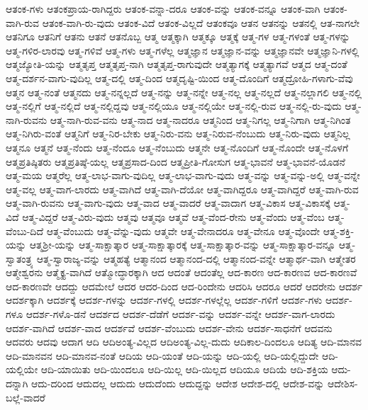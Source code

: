 {ಆತಂಕ-ಗಳು
ಆತಂಕಪ್ರಾಯ-ರಾಗಿದ್ದರು
ಆತಂಕ-ವನ್ನಾ-ದರೂ
ಆತಂಕ-ವನ್ನು
ಆತಂಕ-ವನ್ನೂ
ಆತಂಕ-ವಾಗಿ
ಆತಂಕ-ವಾಗಿ-ರುವ
ಆತಂಕ-ವಾಗಿ-ರು-ವುದು
ಆತಂಕ-ವಿದೆ
ಆತಂಕ-ವಿಲ್ಲದೆ
ಆತಂಕವೂ
ಆತನ
ಆತನನ್ನು
ಆತನಲ್ಲಿ
ಆತ-ನಾಗಲೇ
ಆತನಿಗೂ
ಆತನಿಗೆ
ಆತನು
ಆತನೆ
ಆತನೊಬ್ಬ
ಆತ್ಮ
ಆತ್ಮಕ್ಕಾಗಿ
ಆತ್ಮಕ್ಕೂ
ಆತ್ಮಕ್ಕೆ
ಆತ್ಮ-ಗಳ
ಆತ್ಮ-ಗಳಂತೆ
ಆತ್ಮ-ಗಳನ್ನು
ಆತ್ಮ-ಗಳಿರ-ಲಾರವು
ಆತ್ಮ-ಗಳಿವೆ
ಆತ್ಮ-ಗಳು
ಆತ್ಮ-ಗಳೆಲ್ಲ
ಆತ್ಮಜ್ಞಾನ
ಆತ್ಮಜ್ಞಾನ-ವನ್ನು
ಆತ್ಮಜ್ಞಾನವೇ
ಆತ್ಮಜ್ಞಾನಿ-ಗಳಲ್ಲಿ
ಆತ್ಮಜ್ಯೋತಿ-ಯನ್ನು
ಆತ್ಮತೃಪ್ತ
ಆತ್ಮತೃಪ್ತ-ನಾಗಿ
ಆತ್ಮತೃಪ್ತ-ರಾಗುವುದೇ
ಆತ್ಮತ್ಯಾಗಕ್ಕೆ
ಆತ್ಮತ್ಯಾಗವೆ
ಆತ್ಮದ
ಆತ್ಮ-ದಂತೆ
ಆತ್ಮ-ದರ್ಶನ-ವಾಗು-ವುದಿಲ್ಲ
ಆತ್ಮ-ದಲ್ಲಿ
ಆತ್ಮ-ದಿಂದ
ಆತ್ಮದೃಷ್ಟಿ-ಯಿಂದ
ಆತ್ಮ-ದೊಂದಿಗೆ
ಆತ್ಮದ್ರೋಹಿ-ಗಳಾಗು-ವೆವು
ಆತ್ಮನ
ಆತ್ಮ-ನಂತೆ
ಆತ್ಮನದು
ಆತ್ಮ-ನನ್ನಲ್ಲದೆ
ಆತ್ಮ-ನನ್ನು
ಆತ್ಮ-ನನ್ನೇ
ಆತ್ಮ-ನಲ್ಲ
ಆತ್ಮ-ನಲ್ಲದೆ
ಆತ್ಮ-ನಲ್ಲಾಗಲಿ
ಆತ್ಮ-ನಲ್ಲಿ
ಆತ್ಮ-ನಲ್ಲಿಗೆ
ಆತ್ಮ-ನಲ್ಲಿದೆ
ಆತ್ಮ-ನಲ್ಲಿದ್ದವು
ಆತ್ಮ-ನಲ್ಲಿಯೂ
ಆತ್ಮ-ನಲ್ಲಿಯೇ
ಆತ್ಮ-ನಲ್ಲಿ-ರುವ
ಆತ್ಮ-ನಲ್ಲಿ-ರು-ವುದು
ಆತ್ಮ-ನಾಗಿ-ರುವನು
ಆತ್ಮ-ನಾಗಿ-ರುವ-ವನು
ಆತ್ಮ-ನಾದ
ಆತ್ಮ-ನಾದರೂ
ಆತ್ಮನಿಂದ
ಆತ್ಮ-ನಿಗಲ್ಲ
ಆತ್ಮ-ನಿಗಾಗಿ
ಆತ್ಮ-ನಿಗಿಂತ
ಆತ್ಮ-ನಿಗಿರು-ವಂತೆ
ಆತ್ಮನಿಗೆ
ಆತ್ಮ-ನಿರ-ಬೇಕು
ಆತ್ಮ-ನಿರು-ವನು
ಆತ್ಮ-ನಿರುವ-ನೆಂಬುದು
ಆತ್ಮ-ನಿರು-ವುದು
ಆತ್ಮನಿಲ್ಲ
ಆತ್ಮನೂ
ಆತ್ಮನೆ
ಆತ್ಮ-ನೆಂದು
ಆತ್ಮ-ನೆಂದೂ
ಆತ್ಮ-ನೆಂಬುದು
ಆತ್ಮನೇ
ಆತ್ಮ-ನೊಂದಿಗೆ
ಆತ್ಮ-ನೊಂದೇ
ಆತ್ಮ-ನೊಳಗೆ
ಆತ್ಮಪ್ರತಿಷ್ಠಿತರು
ಆತ್ಮಪ್ರತಿಷ್ಠೆ-ಯಲ್ಲ
ಆತ್ಮಪ್ರಸಾದ-ದಿಂದ
ಆತ್ಮಪ್ರೀತಿ-ಗೋಸುಗ
ಆತ್ಮ-ಭಾವನೆ
ಆತ್ಮ-ಭಾವನೆ-ಯೊಡನೆ
ಆತ್ಮ-ಮಯ
ಆತ್ಮರೆಲ್ಲ
ಆತ್ಮ-ಲಾಭ-ವಾಗು-ವುದಿಲ್ಲ
ಆತ್ಮ-ಲಾಭ-ವಾಗು-ವುದು
ಆತ್ಮ-ವನ್ನು
ಆತ್ಮ-ವನ್ನು-ಅಲ್ಲಿ
ಆತ್ಮ-ವನ್ನೇ
ಆತ್ಮ-ವಲ್ಲ
ಆತ್ಮ-ವಾಗ-ಲಾರದು
ಆತ್ಮ-ವಾಗಿದೆ
ಆತ್ಮ-ವಾಗಿ-ದೆಯೋ
ಆತ್ಮ-ವಾಗಿದ್ದರೂ
ಆತ್ಮ-ವಾಗಿದ್ದರೆ
ಆತ್ಮ-ವಾಗಿ-ರುವ
ಆತ್ಮ-ವಾಗಿ-ರುವನು
ಆತ್ಮ-ವಾಗು-ವುದು
ಆತ್ಮ-ವಾದ
ಆತ್ಮ-ವಾದರೆ
ಆತ್ಮ-ವಾದಾಗ
ಆತ್ಮ-ವಿಕಾಸ
ಆತ್ಮ-ವಿಕಾಸಕ್ಕೆ
ಆತ್ಮ-ವಿದೆ
ಆತ್ಮ-ವಿದ್ದರೆ
ಆತ್ಮ-ವಿರು-ವುದು
ಆತ್ಮವು
ಆತ್ಮವೂ
ಆತ್ಮವೆ
ಆತ್ಮ-ವೆಂದ-ರೇನು
ಆತ್ಮ-ವೆಂದು
ಆತ್ಮ-ವೆಂಬ
ಆತ್ಮ-ವೆಂಬು-ದಿದೆ
ಆತ್ಮ-ವೆಂಬುದು
ಆತ್ಮ-ವೆನ್ನು-ವುದು
ಆತ್ಮವೇ
ಆತ್ಮ-ವೇನಾದರೂ
ಆತ್ಮ-ವೇನೂ
ಆತ್ಮ-ವೊಂದೇ
ಆತ್ಮ-ಶಕ್ತಿ-ಯನ್ನು
ಆತ್ಮಶ್ರೀ-ಯನ್ನು
ಆತ್ಮ-ಸಾಕ್ಷಾತ್ಕಾರ
ಆತ್ಮ-ಸಾಕ್ಷಾತ್ಕಾರಕ್ಕೆ
ಆತ್ಮ-ಸಾಕ್ಷಾತ್ಕಾರ-ವನ್ನು
ಆತ್ಮ-ಸಾಕ್ಷಾತ್ಕಾರ-ವನ್ನೂ
ಆತ್ಮ-ಸ್ವಾತಂತ್ರ್ಯ
ಆತ್ಮ-ಸ್ವಾರಾಜ್ಯ-ವನ್ನು
ಆತ್ಮಹತ್ಯೆ
ಆತ್ಮಾನಂದ
ಆತ್ಮಾನಂದ-ದಲ್ಲಿ
ಆತ್ಮಾನಂದ-ವನ್ನೇ
ಆತ್ಮಾರ್ಥ-ವಾಗಿ
ಆತ್ಮೇತರ
ಆತ್ಮೇಶ್ವರನು
ಆತ್ಮೈಕ್ಯ-ವಾಗಿದೆ
ಆತ್ಮೋದ್ಧಾರಕ್ಕಾಗಿ
ಆದ
ಆದಂತೆ
ಆದಂತೆಲ್ಲ
ಆದ-ಕಾರಣ
ಆದ-ಕಾರಣವ
ಆದ-ಕಾರಣವೆ
ಆದ-ಕಾರಣವೇ
ಆದದ್ದು
ಆದಮೇಲೆ
ಆದರ
ಆದರ-ದಿಂದ
ಆದ-ರಿಂದೇನು
ಆದರಿಸಿ
ಆದರೂ
ಆದರೆ
ಆದರೇನು
ಆದರ್ಶ
ಆದರ್ಶಕ್ಕಾಗಿ
ಆದರ್ಶಕ್ಕೆ
ಆದರ್ಶ-ಗಳನ್ನು
ಆದರ್ಶ-ಗಳಲ್ಲಿ
ಆದರ್ಶ-ಗಳಲ್ಲೆಲ್ಲ
ಆದರ್ಶ-ಗಳಿಗೆ
ಆದರ್ಶ-ಗಳು
ಆದರ್ಶ-ಗಳೂ
ಆದರ್ಶ-ಗಳೊ-ಡನೆ
ಆದರ್ಶದ
ಆದರ್ಶ-ದೆಡೆಗೆ
ಆದರ್ಶ-ವನ್ನು
ಆದರ್ಶ-ವನ್ನೇ
ಆದರ್ಶ-ವಾಗ-ಲಾರದು
ಆದರ್ಶ-ವಾಗಿದೆ
ಆದರ್ಶ-ವಾದ
ಆದರ್ಶವೆ
ಆದರ್ಶ-ವೆಂಬುದು
ಆದರ್ಶ-ವೇನು
ಆದರ್ಶ-ಸಾಧನೆಗೆ
ಆದವನು
ಆದವರು
ಆದವು
ಆದಾಗ
ಆದಿ
ಆದಿಅಂತ್ಯ-ವಿಲ್ಲದ
ಆದಿಅಂತ್ಯ-ವಿಲ್ಲ-ದುದು
ಆದಿಕಾಲ-ದಿಂದಲೂ
ಆದಿತ್ಯ
ಆದಿ-ಮಾನವ
ಆದಿ-ಮಾನವನ
ಆದಿ-ಮಾನವ-ನಂತೆ
ಆದಿಯ
ಆದಿ-ಯಂತೆ
ಆದಿ-ಯನ್ನು
ಆದಿ-ಯಲ್ಲಿ
ಆದಿ-ಯಲ್ಲಿದ್ದುದೇ
ಆದಿ-ಯಲ್ಲಿಯೇ
ಆದಿ-ಯಾಯಿತು
ಆದಿ-ಯಿಂದಲೂ
ಆದಿ-ಯಿಲ್ಲ
ಆದಿ-ಯಿಲ್ಲದ
ಆದಿಯೂ
ಆದಿಯೆ
ಆದಿ-ಶಕ್ತಿಯ
ಆದು-ದನ್ನಾಗಿ
ಆದು-ದರಿಂದ
ಆದುದಲ್ಲ
ಆದುದು
ಆದುದೆಂದು
ಆದುದ್ದನ್ನು
ಆದೇಶ
ಆದೇಶ-ದಲ್ಲಿ
ಆದೇಶ-ವನ್ನು
ಆದೇಶಿಸ-ಬಲ್ಲೆ-ವಾದರೆ
}
